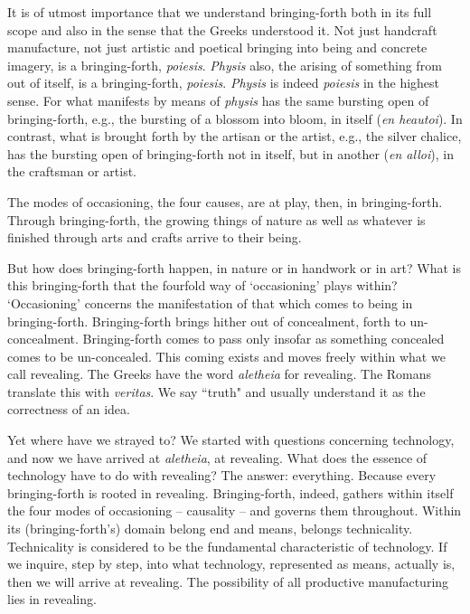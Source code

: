 \documentclass[paper=a4, fontsize=11pt,twoside]{scrartcl}
\begin{document}
It is of utmost importance that we understand bringing-forth both in its full scope and also in the sense that the Greeks understood it. Not just handcraft manufacture, not just artistic and poetical bringing into being and concrete imagery, is a bringing-forth, \textit{poi{\-e}sis}. \textit{Physis} also, the arising of something from out of itself, is a bringing-forth, \textit{poi{\-e}sis}. \textit{Physis} is indeed \textit{poi{\-e}sis} in the highest sense. For what manifests by means of \textit{physis} has the same bursting open of bringing-forth, e.g., the bursting of a blossom into bloom, in itself (\textit{en heaut{\-o}i}). In contrast, what is brought forth by the artisan or the artist, e.g., the silver chalice, has the bursting open of bringing-forth not in itself, but in another (\textit{en all{\-o}i}), in the craftsman or artist.

The modes of occasioning, the four causes, are at play, then, in bringing-forth. Through bringing-forth, the growing things of nature as well as whatever is finished through arts and crafts arrive to their being.

But how does bringing-forth happen, in nature or in handwork or in art? What is this bringing-forth that the fourfold way of `occasioning' plays within? `Occasioning' concerns the manifestation of that which comes to being in bringing-forth. Bringing-forth brings hither out of concealment, forth to un-concealment. Bringing-forth comes to pass only insofar as something concealed comes to be un-concealed. This coming exists and moves freely within what we call revealing. The Greeks have the word \textit{al{\-e}theia} for revealing. The Romans translate this with \textit{veritas}. We say ``truth" and usually understand it as the correctness of an idea.

\vspace{10mm}

Yet where have we strayed to? We started with questions concerning technology, and now we have arrived at \textit{al{\-e}theia}, at revealing. What does the essence of technology have to do with revealing? The answer: everything. Because every bringing-forth is rooted in revealing. Bringing-forth, indeed, gathers within itself the four modes of occasioning -- causality -- and governs them throughout. Within its (bringing-forth's) domain belong end and means, belongs technicality. Technicality is considered to be the fundamental characteristic of technology. If we inquire, step by step, into what technology, represented as means, actually is, then we will arrive at revealing. The possibility of all productive manufacturing lies in revealing.
\end{document}
